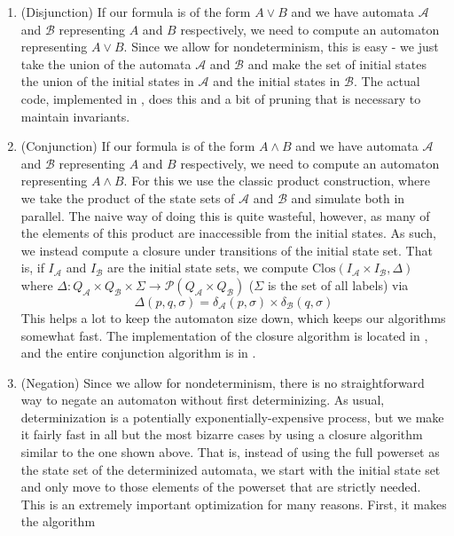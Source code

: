 \documentclass{hw}
\begin{document}
\begin{enumerate}
  \item (Disjunction) If our formula is of the form $A \vee B$ and we have automata
  $\mathcal{A}$ and $\mathcal{B}$ representing $A$ and $B$ respectively, we need to compute
  an automaton representing $A \vee B$. Since we allow for nondeterminism, this is easy
  - we just take the union of the automata $\mathcal{A}$ and $\mathcal{B}$ and make
  the set of initial states the union of the initial states in $\mathcal{A}$ and the initial
  states in $\mathcal{B}$. The actual code, implemented in , does this and a bit
  of pruning that is necessary to maintain invariants.
  \item (Conjunction)  If our formula is of the form $A \wedge B$ and we have automata
  $\mathcal{A}$ and $\mathcal{B}$ representing $A$ and $B$ respectively, we need to compute
  an automaton representing $A \wedge B$. For this we use the classic product construction,
  where we take the product of the state sets of $\mathcal{A}$ and $\mathcal{B}$ and simulate
  both in parallel. The naive way of doing this is quite wasteful, however, as many of
  the elements of this product are inaccessible from the initial states. As such, we
  instead compute a closure under transitions of the initial state set. That is, if $I_{\mathcal{A}}$
  and $I_{\mathcal{B}}$ are the initial state sets, we compute $\mathrm{Clos}(I_{\mathcal{A}} \times I_{\mathcal{B}}, \Delta)$
  where $\Delta: Q_{\mathcal{A}} \times Q_{\mathcal{B}} \times \Sigma \to \mathcal{P}(Q_{\mathcal{A}} \times Q_{\mathcal{B}})$
  ($\Sigma$ is the set of all labels) via
  $$\Delta(p, q, \sigma) = \delta_{\mathcal{A}}(p, \sigma) \times \delta_{\mathcal{B}}(q, \sigma)$$
  This helps a lot to keep the automaton size down, which keeps our algorithms somewhat fast. The
  implementation of the closure algorithm is located in , and the entire conjunction algorithm
  is in .
  \item (Negation) Since we allow for nondeterminism, there is no straightforward way to
  negate an automaton without first determinizing. As usual, determinization is a potentially
  exponentially-expensive process, but we make it fairly fast in all but the most bizarre
  cases by using a closure algorithm similar to the one shown above. That is, instead of using
  the full powerset as the state set of the determinized automata, we start with the initial
  state set and only move to those elements of the powerset that are strictly needed.
  This is an extremely important optimization for many reasons. First, it makes the algorithm

\end{enumerate}
\end{document}
